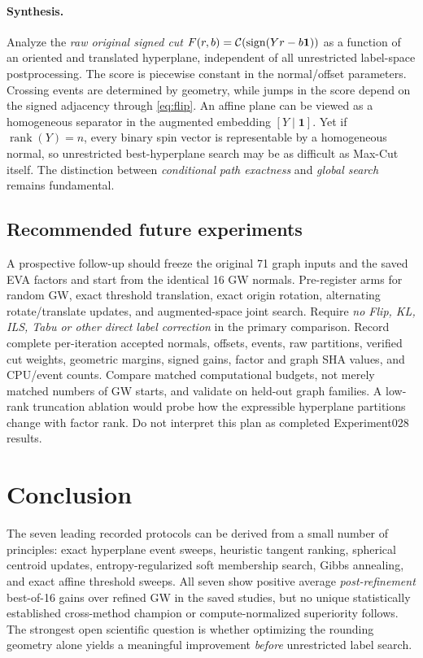 \paragraph{Synthesis.} Analyze the \emph{raw original signed cut} $F(r,b)=\mathcal{C}(\operatorname{sign}(Yr-b\mathbf{1}))$ as a function of an oriented and translated hyperplane, independent of all unrestricted label-space postprocessing. The score is piecewise constant in the normal/offset parameters. Crossing events are determined by geometry, while jumps in the score depend on the signed adjacency through \eqref{eq:flip}. An affine plane can be viewed as a homogeneous separator in the augmented embedding $[Y\mid\mathbf{1}]$. Yet if $\operatorname{rank}(Y)=n$, every binary spin vector is representable by a homogeneous normal, so unrestricted best-hyperplane search may be as difficult as Max-Cut itself. The distinction between \emph{conditional path exactness} and \emph{global search} remains fundamental.

\subsection{Recommended future experiments}
A prospective follow-up should freeze the original 71 graph inputs and the saved EVA factors and start from the identical 16 GW normals. Pre-register arms for random GW, exact threshold translation, exact origin rotation, alternating rotate/translate updates, and augmented-space joint search. Require \emph{no Flip, KL, ILS, Tabu or other direct label correction} in the primary comparison. Record complete per-iteration accepted normals, offsets, events, raw partitions, verified cut weights, geometric margins, signed gains, factor and graph SHA values, and CPU/event counts. Compare matched computational budgets, not merely matched numbers of GW starts, and validate on held-out graph families. A low-rank truncation ablation would probe how the expressible hyperplane partitions change with factor rank. Do not interpret this plan as completed Experiment028 results.

\section{Conclusion}
The seven leading recorded protocols can be derived from a small number of principles: exact hyperplane event sweeps, heuristic tangent ranking, spherical centroid updates, entropy-regularized soft membership search, Gibbs annealing, and exact affine threshold sweeps. All seven show positive average \emph{post-refinement} best-of-16 gains over refined GW in the saved studies, but no unique statistically established cross-method champion or compute-normalized superiority follows. The strongest open scientific question is whether optimizing the rounding geometry alone yields a meaningful improvement \emph{before} unrestricted label search.

